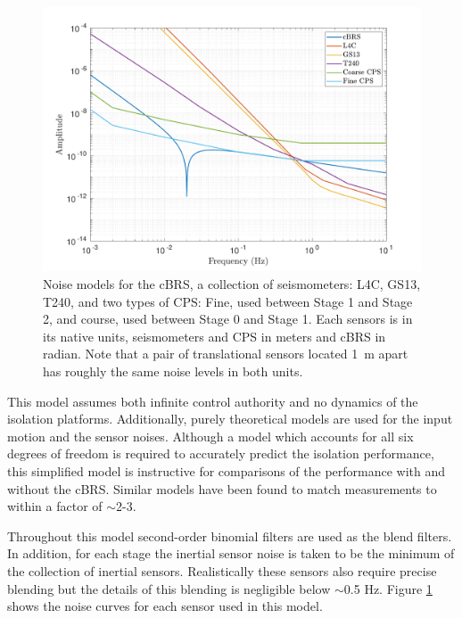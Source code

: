 \documentclass [12pt, proquest]{uwthesis}[2019]
\begin{document}
\begin{figure}[!h]
\begin{center}
\includegraphics[width=\textwidth]{cBRS_Model_Noise.pdf}
\caption[Noise models for the cBRS, a collection of seismometers, and two types of CPS]{Noise models for the cBRS, a collection of seismometers: L4C, GS13, T240, and two types of CPS: Fine, used between Stage 1 and Stage 2, and course, used between Stage 0 and Stage 1. Each sensors is in its native units, seismometers and CPS in meters and cBRS in radian. Note that a pair of translational sensors located 1~m apart has roughly the same noise levels in both units.}
\label{sensNoise}
\end{center}
\end{figure}

This model assumes both infinite control authority and no dynamics of the isolation platforms. Additionally, purely theoretical models are used for the input motion and the sensor noises. Although a model which accounts for all six degrees of freedom is required to accurately predict the isolation performance, this simplified model is instructive for comparisons of the performance with and without the cBRS. Similar models \cite{windproofing} have been found to match measurements to within a factor of $\sim$2-3.

Throughout this model second-order binomial filters are used as the blend filters. In addition, for each stage the inertial sensor noise is taken to be the minimum of the collection of inertial sensors. Realistically these sensors also require precise blending but the details of this blending is negligible below $\sim$0.5 Hz. Figure \ref{sensNoise} shows the noise curves for each sensor used in this model.
\end{document}

